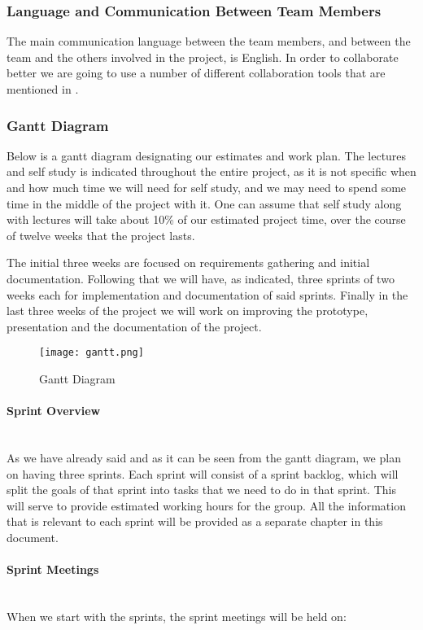 \documentclass[../document.tex]{subfiles}
\begin{document}
\subsubsection{Language and Communication Between Team Members}
The main communication language between the team members, and between the team and the others involved in the project, is English. In order to collaborate better we are going to use a number of different collaboration tools that are mentioned in .


\subsubsection{Gantt Diagram}
Below is a gantt diagram designating our estimates and work plan. The lectures and self study is indicated throughout the entire project, as it is not specific when and how much time we will need for self study, and we may need to spend some time in the middle of the project with it. One can assume that self study along with lectures will take about 10\% of our estimated project time, over the course of twelve weeks that the project lasts.

The initial three weeks are focused on requirements gathering and initial documentation. Following that we will have, as indicated, three sprints of two weeks each for implementation and documentation of said sprints. Finally in the last three weeks of the project we will work on improving the prototype, presentation and the documentation of the project.

\begin{figure}[H]
\centering
\texttt{[image: gantt.png]}
\caption{Gantt Diagram}
\end{figure}

\paragraph{Sprint Overview} \ \\
As we have already said and as it can be seen from the gantt diagram, we plan on having three sprints. Each sprint will consist of a sprint backlog, which will split the goals of that sprint into tasks that we need to do in that sprint. This will serve to provide estimated working hours for the group. All the information that is relevant to each sprint will be provided as a separate chapter in this document. 

\paragraph{Sprint Meetings} \ \\
When we start with the sprints, the sprint meetings will be held on:
\end{document}
